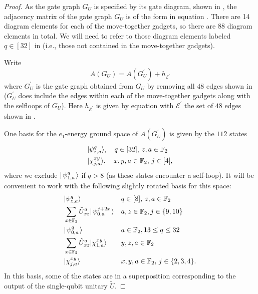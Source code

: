 \documentclass[../thesis-main/thesis-main]{subfiles}
\begin{document}
\begin{proof}
As the gate graph $G_U$ is specified by its gate diagram, shown in , the adjacency matrix of the gate graph $G_{U}$ is of the form in equation . There are 14 diagram elements for each of the move-together gadgets, so there are $88$ diagram elements in total. We will need to refer to those diagram elements labeled $q\in [32]$ in  (i.e., those not contained in the move-together gadgets).

Write 
\begin{equation}
  A(G_{U})=A(G_{U}^{\prime})+h_{\mathcal{E}^{\prime}}
\end{equation}
where $G_{U}^{\prime}$ is the gate graph obtained from $G_{U}$ by removing all $48$ edges shown in  ($G_U^{\prime}$ does include the edges within each of the move-together gadgets along with the selfloops of $G_{U}$). Here $h_{\mathcal{E}^{\prime}}$ is given by equation  with $\mathcal{E^{\prime}}$ the set of $48$ edges shown in .

One basis for the $e_1$-energy ground space of $A(G_{U}^{\prime})$ is given by the $112$ states 
\begin{align}
  &|\psi_{z,a}^{q}\rangle,\quad q\in [32],\, z,a\in \mathbb{F}_2 \\
  &|\chi_{j,a}^{xy}\rangle,\quad x,y,a\in\mathbb{F}_2,\, j\in[4],
\end{align}
where we exclude $|\mspace{2mu} \psi_{1,a}^q \mspace{2mu} \rangle$ if $q > 8$ (as these states encounter a self-loop). It will be convenient to work with the following slightly rotated basis for this space:
\begin{align}
  &|\psi_{z,a}^{q}\rangle&&q\in[8],\, z,a\in \mathbb{F}_2 \\
  & \sum_{x\in\mathbb{F}_2} \tilde{U}^a_{xz}  |\mspace{2mu} \psi_{0,a}^{j + 2 x} \mspace{2mu} \rangle&& a,z\in\mathbb{F}_2, j\in \{9,10\}\\
  & |\mspace{2mu} \psi_{0,a}^q \mspace{2mu} \rangle&&  a\in \mathbb{F}_2, 13 \leq q \leq 32\\
  &\sum_{x\in \mathbb{F}_2}\tilde{U}^a_{xz}|\chi_{1,a}^{xy}\rangle&& y,z,a\in\mathbb{F}_2 \\
  &|\chi_{j,a}^{xy}\rangle&& x,y,a\in\mathbb{F}_2,\, j\in \{2,3,4\}.
\end{align}
In this basis, some of the states are in a superposition corresponding to the output of the single-qubit unitary $\tilde U$.


\end{proof}
\end{document}
